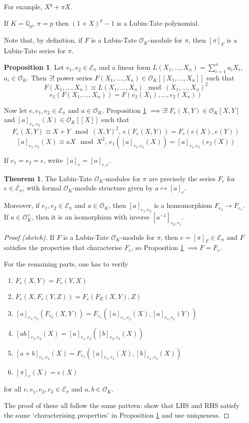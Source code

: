 \documentclass[a4paper]{article}
\theoremstyle{definition}
\theoremstyle{default}
\newtheorem{theorem}[definition]{Theorem}
\newtheorem{prop}[definition]{Proposition}
\theoremstyle{remark}
\begin{document}
For example, $X^q + \pi X$.

If $K = \mathbb{Q}_p$, $\pi = p$ then $(1+X)^p-1$ is a Lubin-Tate polynomial.

Note that, by definition,
if $F$ is a Lubin-Tate $\mathcal{O}_K$-module for $\pi$,
then $[\pi]_F$ is a Lubin-Tate series for $\pi$.

\begin{prop}
	Let $e_1, e_2 \in \mathcal{E}_\pi$ and a linear form $L(X_1, \dots, X_n) = \sum_{i=1}^n a_i X_i$,
	$a_i \in \mathcal{O}_K$.
	Then $\exists!$ power series $F(X_1, \dots, X_n) \in \mathcal{O}_K[[X_1, \dots, X_n]]$ such that
	$$F(X_1, \dots, X_n) \equiv L(X_1, \dots, X_n) \mod (X_1, \dots, X_n)^2$$
	$$e_1(F(X_1, \dots, X_n)) = F(e_2(X_1), \dots, e_2(X_n))$$
	\label{120}
\end{prop}

Now let $e, e_1, e_2 \in \mathcal{E}_\pi$ and $a \in \mathcal{O}_K$.
Proposition \ref{120} $\implies \exists!\ F_e(X,Y) \in \mathcal{O}_K[X, Y]$
and $[a]_{e_1, e_2}(X) \in \mathcal{O}_K[[X]]$ such that
$$F_e(X, Y) \equiv X + Y \mod (X, Y)^2,\, e(F_e(X,Y)) = F_e(e(X), e(Y))$$
$$[a]_{e_1, e_2}(X) \equiv aX \mod X^2,\, e_1([a]_{e_1, e_2}(X)) = [a]_{e_1, e_2}(e_2(X))$$

If $e_1 = e_2 = e$, write $[a]_e = [a]_{e, e}$.

\begin{theorem}
	The Lubin-Tate $\mathcal{O}_K$-modules for $\pi$ are precisely the series $F_e$
	for $e \in \mathcal{E}_\pi$,
	with formal $\mathcal{O}_K$-module structure given by $a \mapsto [a]_e$.
	
	Moreover, if $e_1, e_2 \in \mathcal{E}_\pi$ and $a \in \mathcal{O}_K$,
	then $[a]_{e_1, e_2}$ is a homomorphism $F_{e_2} \to F_{e_1}$.
	If $a \in \mathcal{O}_K^\times$,
	then it is an isomorphism with inverse $[a^{-1}]_{e_2, e_1}$.
	\label{121}
\end{theorem}
\begin{proof}[Proof (sketch)]
	If $F$ is a Lubin-Tate $\mathcal{O}_K$-module for $\pi$,
	then $e=[\pi]_F \in \mathcal{E}_\pi$ and $F$ satisfies the properties that characterise $F_e$,
	so Proposition \ref{120} $\implies F=F_e$.
	
	For the remaining parts, one has to verify
	\begin{enumerate}
		\item $F_e(X,Y) = F_e(Y, X)$
		\item $F_e(X, F_e(Y,Z)) = F_e(F_E(X, Y), Z)$
		\item $[a]_{e_1, e_2}(F_{e_2}(X, Y)) = F_{e_1}([a]_{e_1, e_2}(X), [a]_{e_1, e_2}(Y))$
		\item $[ab]_{e_1, e_3}(X) = [a]_{e_1, e_2}([b]_{e_2, e_3}(X))$
		\item $[a+b]_{e_1, e_2}(X) = F_{e_1}([a]_{e_1, e_2}(X), [b]_{e_1, e_2}(X))$
		\item $[\pi]_e(X) = e(X)$
	\end{enumerate}
	for all $e, e_1, e_2, e_3 \in \mathcal{E}_\pi$ and $a, b \in \mathcal{O}_K$.
	
	The proof of these all follow the same pattern:
	show that LHS and RHS satisfy the same `characterising properties' in Proposition \ref{120}
	and use uniqueness.
\end{proof}
\end{document}
